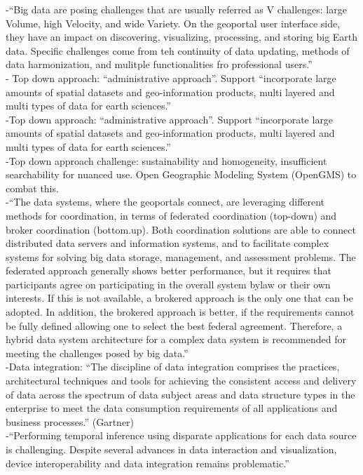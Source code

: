 -{\color{orange}“Big data are posing challenges that are usually referred as V challenges: large Volume, high Velocity, and wide Variety. On the geoportal user interface side, they have an impact on discovering, visualizing, processing, and storing big Earth data. Specific challenges come from teh continuity of data updating, methods of data harmonization, and mulitple functionalities fro professional users.”\cite{Jiang2020}}\\
-{\color{orange} Top down approach: “administrative approach”. Support “incorporate large amounts of spatial datasets and geo-information products, multi layered and multi types of data for earth sciences.” \cite{Jiang2020}}\\
-{\color{orange}Top down approach: “administrative approach”. Support “incorporate large amounts of spatial datasets and geo-information products, multi layered and multi types of data for earth sciences.” \cite{Jiang2020}}\\
-{\color{orange}Top down approach challenge: sustainability and homogeneity, insufficient searchability for nuanced use. Open Geographic Modeling System (OpenGMS) to combat this.\cite{Jiang2020}}\\
-{\color{orange}“The data systems, where the geoportals connect, are leveraging different methods for coordination, in terms of federated coordination (top-down) and broker coordination (bottom.up). Both coordination solutions are able to connect distributed data servers and information systems, and to facilitate complex systems for solving big data storage, management, and assessment problems. The federated approach generally shows better performance, but it requires that participants agree on participating in the overall system bylaw or their own interests. If this is not available, a brokered approach is the only one that can be adopted. In addition, the brokered approach is better, if the requirements cannot be fully defined allowing one to select the best federal agreement. Therefore, a hybrid data system architecture for a complex data system is recommended for meeting the challenges posed by big data.”\cite{Jiang2020}}\\
-{\color{orange}Data integration: “The discipline of data integration comprises the practices, architectural techniques and tools for achieving the consistent access and delivery of data across the spectrum of data subject areas and data structure types in the enterprise to meet the data consumption requirements of all applications and business processes.” (Gartner)\cite{Hintz2020}}\\
-{\color{orange}“Performing temporal inference using disparate applications for each data source is challenging. Despite several advances in data interaction and visualization, device interoperability and data integration remains problematic.”\cite{Zhang2019}}\\


